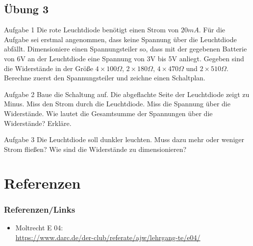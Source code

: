 \subsection*{Übung 3}
\begin{frame}
  \begin{alertblock}{Aufgabe 1}
    Die rote Leuchtdiode benötigt einen Strom von $20mA$. Für die Aufgabe sei erstmal angenommen, dass keine Spannung über die Leuchtdiode abfällt. Dimensioniere einen Spannungsteiler so, dass mit der gegebenen Batterie von 6V an der Leuchtdiode eine Spannung von 3V bis 5V anliegt. Gegeben sind die Widerstände in der Größe $4\times100\Omega$, $2\times180\Omega$, $4\times470\Omega$ und $2\times510\Omega$. Berechne zuerst den Spannungsteiler und zeichne einen Schaltplan.
  \end{alertblock}
  \begin{alertblock}{Aufgabe 2}
    Baue die Schaltung auf. Die abgeflachte Seite der Leuchtdiode zeigt zu Minus. Miss den Strom durch die Leuchtdiode. Miss die Spannung über die Widerstände. Wie lautet die Gesamtsumme der Spannungen über die Widerstände? Erkläre.
  \end{alertblock}
  \begin{alertblock}{Aufgabe 3}
    Die Leuchtdiode soll dunkler leuchten. Muss dazu mehr oder weniger Strom fließen? Wie sind die Widerstände zu dimensionieren?
  \end{alertblock}
\end{frame}


\section*{Referenzen}

\begin{frame}
  \frametitle{Referenzen/Links}

  \footnotesize
  \begin{itemize}
    \item Moltrecht E 04: \\
      \url{https://www.darc.de/der-club/referate/ajw/lehrgang-te/e04/}
  \end{itemize}

\end{frame}


